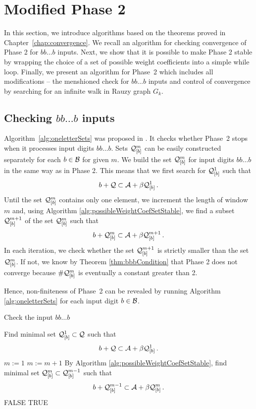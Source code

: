 \section{Modified Phase 2}
\label{sec:modifiedPhase2}

In this section, we introduce algorithms based on the theorems proved in Chapter~\ref{chap:convergence}. We recall an algorithm for checking convergence of Phase 2 for $bb\dots b$ inputs. Next, we show that it is possible to make Phase 2 stable by wrapping the choice of a set of possible weight coefficients into a simple while loop. Finally, we present an algorithm for Phase~2 which includes all modifications -- the menshioned check for $bb\dots b$ inputs and control of convergence by searching for an infinite walk in Rauzy graph $G_k$.

\subsection*{Checking $bb\dots b$ inputs}

Algorithm~\ref{alg:oneletterSets} was proposed in \cite{vu}. It checks whether Phase~2 stops when it processes input digits $bb\dots b$.
Sets $\mathcal{Q}_{[\scriptstyle b]}^{\scriptstyle m}$  can be easily constructed separately for each $b\in\mathcal{B}$ for given $m$. We build the set $\mathcal{Q}_{[\scriptstyle b]}^{\scriptstyle m}$ for input digits $bb\dots b$ in the same way as in Phase 2. This means that we first search for $\mathcal{Q}_{[\scriptstyle b]}^{\scriptstyle 1}$ such that 
$$
b + \mathcal{Q} \subset \mathcal{A} + \beta \mathcal{Q}_{[\scriptstyle b]}^{\scriptstyle 1}\,.
$$
Until the set $\mathcal{Q}_{[\scriptstyle b]}^{\scriptstyle m}$ contains only one element, we increment the length of  window $m$ and, using Algorithm \ref{alg:possibleWeightCoefSetStable}, we find a subset $\mathcal{Q}_{[\scriptstyle b]}^{\scriptstyle m+1}$ of the set $\mathcal{Q}_{[\scriptstyle b]}^{\scriptstyle m}$ such that
$$
b + \mathcal{Q}_{[\scriptstyle b]}^{\scriptstyle m} \subset \mathcal{A} + \beta \mathcal{Q}_{[\scriptstyle b]}^{\scriptstyle m+1}\,.
$$
In each iteration, we check whether the set $\mathcal{Q}_{[\scriptstyle b]}^{\scriptstyle m+1}$ is strictly smaller than the set $\mathcal{Q}_{[\scriptstyle b]}^{\scriptstyle m}$. If not, we know by Theorem \ref{thm:bbbCondition} that Phase 2 does not converge because $\#\mathcal{Q}_{[\scriptstyle b]}^{\scriptstyle m}$ is eventually a constant greater than 2.

Hence, non-finiteness of Phase~2 can be revealed by running Algorithm \ref{alg:oneletterSets} for each input digit $b\in\mathcal{B}$.
\begin{algorithm}
  \caption{Check the input $bb\dots b$}
    \label{alg:oneletterSets}
  \begin{algorithmic}[1]
    \STATE Find minimal set $\mathcal{Q}_{[\scriptstyle b]}^{\scriptstyle 1} \subset \mathcal{Q}$ such that
      $$
      b + \mathcal{Q} \subset \mathcal{A} + \beta \mathcal{Q}_{[\scriptstyle b]}^{\scriptstyle 1}\,.
      $$
      \vspace{-20pt}
    \STATE $m:=1$
        \STATE $m:= m +1$
        \STATE By Algorithm \ref{alg:possibleWeightCoefSetStable}, find minimal set $\mathcal{Q}_{[\scriptstyle b]}^{\scriptstyle m} \subset \mathcal{Q}_{[\scriptstyle b]}^{\scriptstyle m-1}$ such that
          $$
          b + \mathcal{Q}_{[\scriptstyle b]}^{\scriptstyle m-1} \subset \mathcal{A} + \beta \mathcal{Q}_{[\scriptstyle b]}^{\scriptstyle m}\,.
          $$  
          \vspace{-20pt}
            \RETURN FALSE
        \ENDIF
    \ENDWHILE  
    \RETURN TRUE
  \end{algorithmic}
\end{algorithm}



